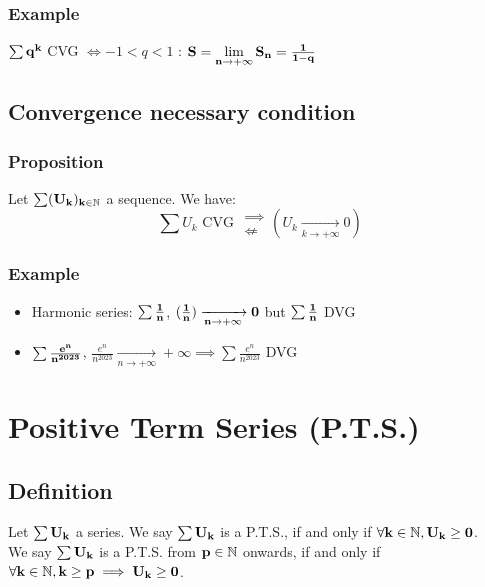 \documentclass[notitlepage]{math}
\begin{document}
\subsubsection{Example}
$\bf \sum q^k$ CVG $\Leftrightarrow \minus 1 < q < 1$ : $\bf S = \lim\limits_{n \to +\infty} S_n = \frac{1}{1 - q}$

\subsection{Convergence necessary condition}
\subsubsection{Proposition}
Let $\bf \sum (U_k)_{k \in \mathbb{N}}$ a sequence. We have:
\[ \sum U_k \text{ CVG } \begin{array}{ r }\implies \\ \not\Longleftarrow \end{array} \left( U_k \xrightarrow[k \to +\infty]{} 0 \right) \]
\subsubsection{Example}
\begin{itemize}
    \item Harmonic series: $\bf \sum \frac{1}{n}$, $\bf (\frac{1}{n}) \xrightarrow[n \to +\infty]{} 0$ but $\bf \sum \frac{1}{n}$ DVG
    \item $\bf \sum \frac{e^n}{n^{2023}}$, $\frac{e^n}{n^{2023}} \xrightarrow[n \to +\infty]{} +\infty \implies \sum \frac{e^n}{n^{2023}}$ DVG
    \end{itemize}

\section{Positive Term Series (P.T.S.)}
\subsection{Definition}
Let $\bf \sum U_k$ a series. We say $\bf \sum U_k$ is a P.T.S., 
if and only if $\bf \forall k \in \mathbb{N}, U_k \geq 0$.\\
We say $\bf \sum U_k$ is a P.T.S. from $\bf p \in \mathbb{N}$ onwards,
if and only if $\bf \forall k \in \mathbb{N}, k \geq p \implies U_k \geq 0$.
\end{document}
